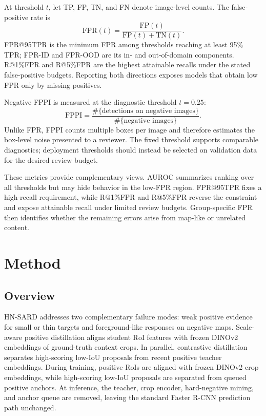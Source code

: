 \documentclass[conference,a4paper]{IEEEtran}
\begin{document}
At threshold $t$, let TP, FP, TN, and FN denote image-level counts. The false-positive rate is
\begin{equation}
\mathrm{FPR}(t)=\frac{\mathrm{FP}(t)}{\mathrm{FP}(t)+\mathrm{TN}(t)}.
\end{equation}
FPR@95TPR is the minimum FPR among thresholds reaching at least 95\% TPR; FPR-ID and FPR-OOD are its in- and out-of-domain components. R@1\%FPR and R@5\%FPR are the highest attainable recalls under the stated false-positive budgets. Reporting both directions exposes models that obtain low FPR only by missing positives.

Negative FPPI is measured at the diagnostic threshold $t=0.25$:
\begin{equation}
\mathrm{FPPI}=\frac{\#\{\text{detections on negative images}\}}
{\#\{\text{negative images}\}}.
\end{equation}
Unlike FPR, FPPI counts multiple boxes per image and therefore estimates the box-level noise presented to a reviewer. The fixed threshold supports comparable diagnostics; deployment thresholds should instead be selected on validation data for the desired review budget.

These metrics provide complementary views. AUROC summarizes ranking over all thresholds but may hide behavior in the low-FPR region. FPR@95TPR fixes a high-recall requirement, while R@1\%FPR and R@5\%FPR reverse the constraint and expose attainable recall under limited review budgets. Group-specific FPR then identifies whether the remaining errors arise from map-like or unrelated content.

\section{Method}
\subsection{Overview}
HN-SARD addresses two complementary failure modes: weak positive evidence for small or thin targets and foreground-like responses on negative maps. Scale-aware positive distillation aligns student RoI features with frozen DINOv2 embeddings of ground-truth context crops. In parallel, contrastive distillation separates high-scoring low-IoU proposals from recent positive teacher embeddings. During training, positive RoIs are aligned with frozen DINOv2 crop embeddings, while high-scoring low-IoU proposals are separated from queued positive anchors. At inference, the teacher, crop encoder, hard-negative mining, and anchor queue are removed, leaving the standard Faster R-CNN prediction path unchanged.
\end{document}
